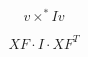 \documentclass{article}
\begin{document}
\[ v \times^{*} I v \]
\pagebreak

\[ XF \cdot I \cdot XF^T \]
\pagebreak
\end{document}
